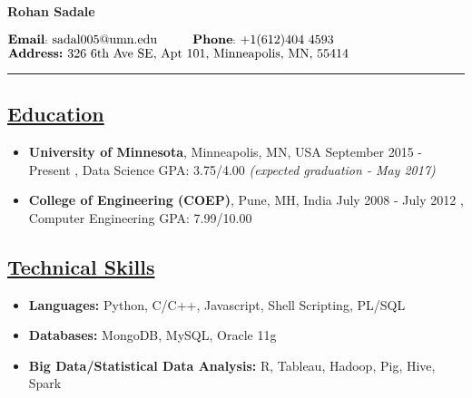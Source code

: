 \documentclass[10pt]{article}
\begin{document}


\begin{raggedleft}
{\bfseries {\huge Rohan Sadale}}
\end{raggedleft}
\hfill
\hfill
\begin{raggedright}
$^{\text{{\bfseries {\normalsize Email}}: {\normalsize sadal005@umn.edu}}{\text{\hspace{28pt}{\bfseries {\normalsize Phone}}: {\normalsize +1(612)404 4593}}}}_{\text{\vspace{10pt}{\bfseries {\normalsize Address:}} {\normalsize 326 6th Ave SE, Apt 101, Minneapolis, MN, 55414}}}$
\end{raggedright}
\vspace{4pt}

\hrule
\vspace{-0.2cm}
\subsection*{\underline{Education}}
\vspace{-0.1cm}
\begin{itemize}[leftmargin=*]
\item[] {\bfseries University of Minnesota}, Minneapolis, MN, USA \hfill September 2015 - Present
, Data Science \hspace{0.2in} GPA: 3.75/4.00  \hfill {\sl (expected graduation - May 2017)}
\vspace{-0.1cm}
\item[] {\bfseries College of Engineering (COEP)}, Pune, MH, India \hfill July 2008 - July 2012  
, Computer Engineering	 \hspace{0.2in} GPA: 7.99/10.00
\end{itemize}

\subsection*{\underline{Technical Skills}}
\vspace{-0.1cm}
\begin{itemize}[leftmargin=*]
 \item[]  \textbf{Languages:}  Python, C/C++, Javascript, Shell Scripting, PL/SQL
 \vspace{-0.25cm}
 \item[]   \textbf{Databases:}  MongoDB, MySQL, Oracle 11g
  \vspace{-0.25cm}
 \item[]   \textbf{Big Data/Statistical Data Analysis:}   R, Tableau, Hadoop, Pig, Hive, Spark
\end{itemize}
\end{document}

